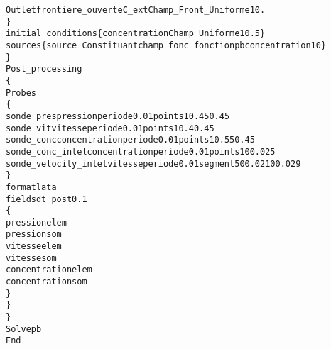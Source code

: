 \begin{alltt}
            Outlet  frontiere_ouverte C_ext Champ_Front_Uniforme 1 0.
        \}
        initial_conditions \{ concentration Champ_Uniforme 1 0.5 \}
        sources \{ source_Constituant champ_fonc_fonction pb concentration 1 0 \}
    \}
    Post_processing
    \{
        Probes
        \{
            sonde_pres pression periode 0.01 points 1 0.45 0.45
            sonde_vit  vitesse periode 0.01 points 1 0.4 0.45
            sonde_conc concentration periode 0.01 points 1 0.55 0.45
            sonde_conc_inlet     concentration periode 0.01 points 1 0 0.025
            sonde_velocity_inlet vitesse periode 0.01 segment 5 0 0.021 0 0.029
        \}
        format lata
        fields dt_post 0.1
        \{
            pression elem
            pression som
            vitesse elem
            vitesse som
            concentration elem
            concentration som
        \}
    \}
\}
Solve pb
End
\end{alltt}
